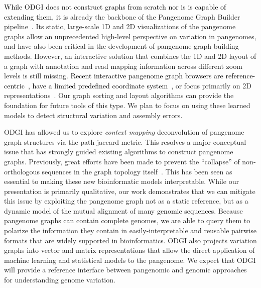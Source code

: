 \documentclass{bioinfo}
\newcommand{\REVIEWED}[1]{{\textcolor{Black}{#1}}}
\begin{document}
\REVIEWED{While ODGI does not construct graphs from scratch nor is is capable of extending them, it} is already the backbone of the Pangenome Graph Builder pipeline~\citep{pggb}.
Its static, large-scale 1D and 2D visualizations of the pangenome graphs allow an unprecedented high-level perspective on variation in pangenomes, and have also been critical in the development of pangenome graph building methods.  %
However, an interactive solution that combines the 1D and 2D layout of a graph with annotation and read mapping information across different zoom levels is still missing.
\REVIEWED{Recent interactive pangenome graph browsers are reference-centric~\citep{Beyer2019, Yokoyama2019}, have a limited predefined coordinate system~\citep{Durant2021}}, or focus primarily on 2D representations~\citep{Wick_2015, Gonnella2018}.
Our graph sorting and layout algorithms can provide the foundation for future tools of this type.
We plan to focus on using these learned models to detect structural variation and assembly errors.

ODGI has allowed us to explore \textit{context mapping} deconvolution of pangenome graph structures via the path jaccard metric.
This resolves a major conceptual issue that has strongly guided existing algorithms to construct pangenome graphs.
Previously, great efforts have been made to prevent the ``collapse'' of non-orthologous sequences in the graph topology itself~\citep{Li:2020}.
This has been seen as essential to making these new bioinformatic models interpretable.
While our presentation is primarily qualitative, our work demonstrates that we can mitigate this issue by exploiting the pangenome graph not as a static reference, but as a dynamic model of the mutual alignment of many \REVIEWED{genomic sequences}.
Because pangenome graphs can contain complete genomes, we are able to query them to polarize the information they contain in easily-interpretable and reusable pairwise formats that are widely supported in bioinformatics.
ODGI also projects variation graphs into vector and matrix representations that allow the direct application of machine learning and statistical models to the pangenome.
We expect that ODGI will provide a reference interface between pangenomic and genomic approaches for understanding genome variation.
\end{document}
